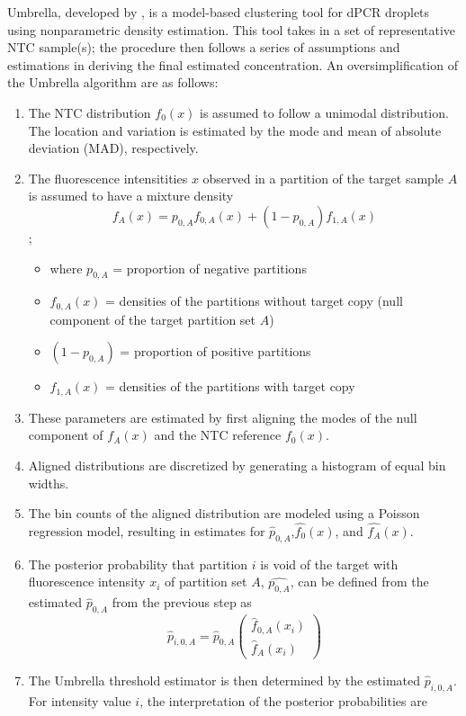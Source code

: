 Umbrella, developed by , is a model-based clustering tool for dPCR droplets using nonparametric density estimation. This tool takes in a set of representative NTC sample(s); the procedure then follows a series of assumptions and estimations in deriving the final estimated concentration. An oversimplification of the Umbrella algorithm are as follows:
\begin{enumerate}
    \item The NTC distribution \(f_0(x)\) is assumed to follow a unimodal distribution. The location and variation is estimated by the mode and mean of absolute deviation (MAD), respectively.
    \item The fluorescence intensitities \(x\) observed in a partition of the target sample \(A\) is assumed to have a mixture density 
    \[f_A(x) = p_{0,A}f_{0,A}(x) + (1-p_{0,A})f_{1,A}(x)\]; 
    \begin{itemize}
        \item where \(p_{0,A}\) = proportion of negative partitions
        \item \(f_{0,A}(x)\) = densities of the partitions without target copy (null component of the target partition set \(A\))
        \item \((1-p_{0,A})\) = proportion of positive partitions
        \item \(f_{1,A}(x)\) = densities of the partitions with target copy
    \end{itemize}
    \item These parameters are estimated by first aligning the modes of the null component of \(f_A(x)\) and the NTC reference \(f_0(x)\).
    \item Aligned distributions are discretized by generating a histogram of equal bin widths.
    \item The bin counts of the aligned distribution are modeled using a Poisson regression model, resulting in estimates for \(\hat{p}_{0,A}\),\(\hat{f_{0}}(x)\), and \(\hat{f_{A}}(x)\).
    \item The posterior probability that partition \(i\) is void of the target with fluorescence intensity \(x_i\) of partition set \(A\), \(\hat{p_{0,A}}\), can be defined from the estimated \(\hat{p}_{0,A}\) from the previous step as
    \[ \hat{p}_{i,0,A}=\hat{p}_{0,A}\left(\begin{array}{c}\hat{f}_{0,A}(x_i)\\ \hat{f}_{A}(x_i)\end{array}\right) \]
    \item The Umbrella threshold estimator is then determined by the estimated \(\hat{p}_{i,0,A}\). For intensity value \(i\), the interpretation of the posterior probabilities are 

\end{enumerate}
